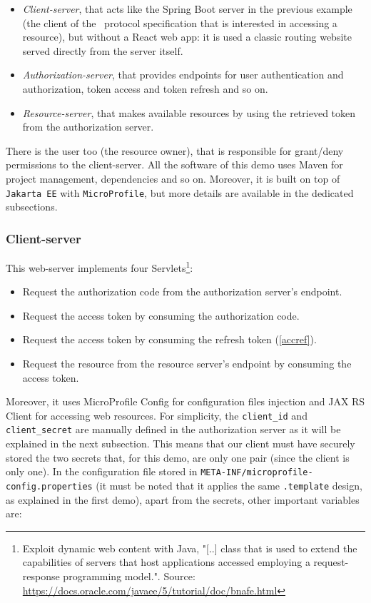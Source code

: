 \begin{itemize}
    \item \textit{Client-server}, that acts like the Spring Boot server in the previous example (the client of the \oauth\ protocol specification that is interested in accessing a resource), but without a React web app: it is used a classic routing website served directly from the server itself.
    \item \textit{Authorization-server}, that provides endpoints for user authentication and authorization, token access and token refresh and so on.
    \item \textit{Resource-server}, that makes available resources by using the retrieved token from the authorization server.
\end{itemize}

There is the user too (the resource owner), that is responsible for grant/deny permissions to the client-server. All the software of this demo uses Maven for project management, dependencies and so on. Moreover, it is built on top of \texttt{Jakarta EE} \cite{jaksec} with \texttt{MicroProfile}, but more details are available in the dedicated subsections. 

\subsubsection{Client-server}
This web-server implements four Servlets\footnote{Exploit dynamic web content with Java, "[..] class that is used to extend the capabilities of servers that host applications accessed employing a request-response programming model.". Source: \url{https://docs.oracle.com/javaee/5/tutorial/doc/bnafe.html}}:

\begin{itemize}
    \item Request the authorization code from the authorization server's endpoint.
    \item Request the access token by consuming the authorization code.
    \item Request the access token by consuming the refresh token (\ref{accref}).
    \item Request the resource from the resource server's endpoint by consuming the access token.
\end{itemize}

\noindent Moreover, it uses MicroProfile Config for configuration files injection and JAX RS Client for accessing web resources. For simplicity, the \texttt{client\_id} and \texttt{client\_secret} are manually defined in the authorization server as it will be explained in the next subsection. This means that our client must have securely stored the two secrets that, for this demo, are only one pair (since the client is only one). In the configuration file stored in \texttt{META-INF/microprofile-config.properties} (it must be noted that it applies the same \texttt{.template} design, as explained in the first demo), apart from the secrets, other important variables are:

